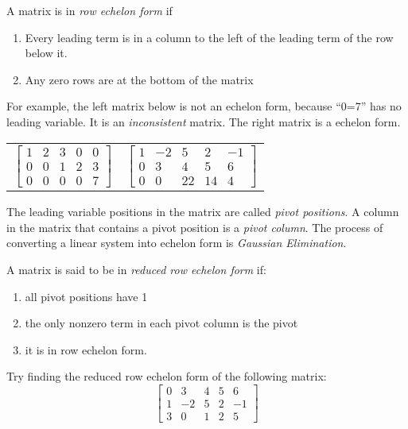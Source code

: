 \begin{definition}
    A matrix is in \emph{row echelon form} if
    \begin{enumerate}[label=\alph*)]
        \item Every leading term is in a column to the left of the leading term of the row below it.
        \item Any zero rows are at the bottom of the matrix
    \end{enumerate}
\end{definition}
For example, the left matrix below is not an echelon form, because ``0=7'' has no leading variable. It is an \emph{inconsistent} matrix. The right matrix is a echelon form.
\begin{center}
    \begin{tabular}{c c}
        $
        \begin{bmatrix}
        1 & 2 & 3 & 0 & 0\\
        0 & 0 & 1 & 2 & 3\\
        0 & 0 & 0 & 0 & 7
        \end{bmatrix}
        $
         & 
         $
        \begin{bmatrix}
        1 & -2 & 5 & 2 & -1\\
        0 & 3 & 4 & 5 & 6\\
        0 & 0 & 22 & 14 & 4
        \end{bmatrix}
        $
        \\
    \end{tabular}
\end{center}

The leading variable positions in the matrix are called \emph{pivot positions}. A column in the matrix that contains a pivot position is a \emph{pivot column}. The process of converting a linear system into echelon form is \emph{Gaussian Elimination}.

\begin{definition}

A matrix is said to be in \emph{reduced row echelon form} if:
\begin{enumerate}[label=\alph*)]
    \item all pivot positions have 1
    \item the only nonzero term in each pivot column is the pivot
    \item it is in row echelon form.
\end{enumerate}
\end{definition}
Try finding the reduced row echelon form of the following matrix:
\begin{equation}
    \begin{bmatrix}
    0 & 3 & 4 & 5 & 6\\
    1 & -2 & 5 & 2 & -1\\
    3 & 0 & 1 & 2 & 5
    \end{bmatrix}
\end{equation}

